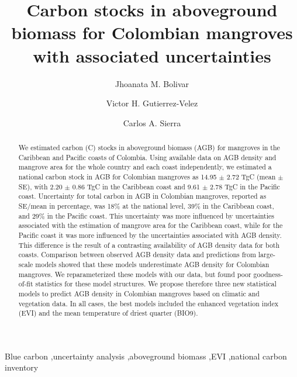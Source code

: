 \documentclass[review, authoryear]{elsarticle}   	%
\begin{document}
\begin{frontmatter}

\title{Carbon stocks in aboveground biomass for Colombian mangroves with associated uncertainties}
\author[MPI,CYB]{Jhoanata M. Bolivar}
\author[TU,CYB]{Victor H. Gutierrez-Velez}
\author[MPI,CYB]{Carlos A. Sierra}
\address[MPI]{Max Planck Institute for Biogeochemistry, Hans-Kn\"oll-Str. 10, 07745 Jena, Germany}
\address[CYB]{Research Center on Ecosystems and Global Change Carbono \& Bosques, Medell\'in, Colombia}
\address[TU]{Department of Geography and Urban Studies, Temple University, Philadelphia, PA 19122, USA}



\begin{abstract}
We estimated carbon (C) stocks in aboveground biomass (AGB) for mangroves in the Caribbean and Pacific coasts of Colombia. Using available data on AGB density and mangrove area for the whole country and each coast independently, we estimated a national carbon stock in AGB for Colombian mangroves as 14.95 $\pm$ 2.72 TgC (mean $\pm$ SE), with 2.20 $\pm$ 0.86 TgC in the Caribbean coast and 9.61 $\pm$ 2.78 TgC in the Pacific coast. Uncertainty for total carbon in AGB in Colombian mangroves, reported as SE/mean in percentage, was 18\% at the national level, 39\% in the Caribbean coast, and 29\% in the Pacific coast. This uncertainty was more influenced by uncertainties associated with the estimation of mangrove area for the Caribbean coast, while for the Pacific coast it was more influenced by the uncertainties associated with AGB density. This difference is the result of a contrasting availability of AGB density data for both coasts.  Comparison between observed AGB density data and predictions from large-scale models showed that these models underestimate AGB density for Colombian mangroves. We reparameterized these models with our data, but found poor goodness-of-fit statistics for these model structures. We propose therefore three new statistical models to predict AGB density in Colombian mangroves based on climatic and vegetation data. In all cases, the best models included the enhanced vegetation index (EVI) and the mean temperature of driest quarter (BIO9). 
\end{abstract}

\begin{keyword}
Blue carbon \sep uncertainty analysis \sep aboveground biomass \sep EVI \sep national carbon inventory
\end{keyword}

\end{frontmatter}
\end{document}
